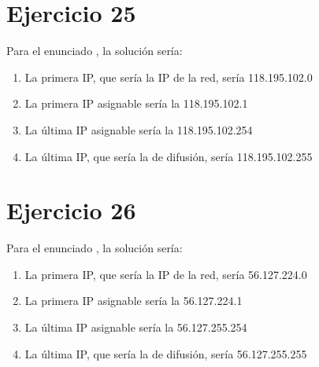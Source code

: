 \documentclass[letterpaper,10pt,spanish]{sphinxmanual}
\begin{document}
\section{Ejercicio 25}
\label{\detokenize{t2_integracion_elementos/ejercicios_subredes_ipv4/rangos_direcciones:id25}}
\sphinxAtStartPar
Para el enunciado , la solución sería:
\begin{enumerate}
%
\item {} 
\sphinxAtStartPar
La primera IP, que sería la IP de la red, sería 118.195.102.0

\item {} 
\sphinxAtStartPar
La primera IP asignable sería la 118.195.102.1

\item {} 
\sphinxAtStartPar
La última IP asignable sería la 118.195.102.254

\item {} 
\sphinxAtStartPar
La última IP, que sería la de difusión, sería 118.195.102.255

\end{enumerate}


\section{Ejercicio 26}
\label{\detokenize{t2_integracion_elementos/ejercicios_subredes_ipv4/rangos_direcciones:id26}}
\sphinxAtStartPar
Para el enunciado , la solución sería:
\begin{enumerate}
%
\item {} 
\sphinxAtStartPar
La primera IP, que sería la IP de la red, sería 56.127.224.0

\item {} 
\sphinxAtStartPar
La primera IP asignable sería la 56.127.224.1

\item {} 
\sphinxAtStartPar
La última IP asignable sería la 56.127.255.254

\item {} 
\sphinxAtStartPar
La última IP, que sería la de difusión, sería 56.127.255.255

\end{enumerate}
\end{document}
